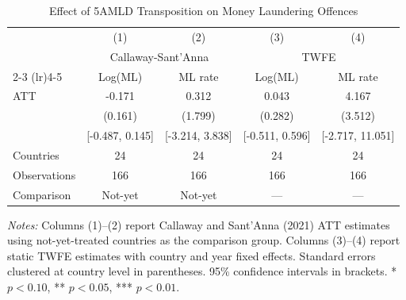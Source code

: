 \begin{table}[htbp]
\centering
\caption{Effect of 5AMLD Transposition on Money Laundering Offences}
\label{tab:main}
\begin{threeparttable}
\begin{tabular}{lcccc}
\toprule
 & (1) & (2) & (3) & (4) \\
 & \multicolumn{2}{c}{Callaway-Sant'Anna} & \multicolumn{2}{c}{TWFE} \\
\cmidrule(lr){2-3} \cmidrule(lr){4-5}
 & Log(ML) & ML rate & Log(ML) & ML rate \\
\midrule
ATT & -0.171 & 0.312 & 0.043 & 4.167 \\
 & (0.161) & (1.799) & (0.282) & (3.512) \\
 & [-0.487, 0.145] & [-3.214, 3.838] & [-0.511, 0.596] & [-2.717, 11.051] \\
\midrule
Countries & 24 & 24 & 24 & 24 \\
Observations & 166 & 166 & 166 & 166 \\
Comparison & Not-yet & Not-yet & --- & --- \\
\bottomrule
\end{tabular}
\begin{tablenotes}[flushleft]\small
\item \textit{Notes:} Columns (1)--(2) report Callaway and Sant'Anna (2021) ATT estimates using not-yet-treated countries as the comparison group. Columns (3)--(4) report static TWFE estimates with country and year fixed effects. Standard errors clustered at country level in parentheses. 95\% confidence intervals in brackets. * $p<0.10$, ** $p<0.05$, *** $p<0.01$.
\end{tablenotes}
\end{threeparttable}
\end{table}
